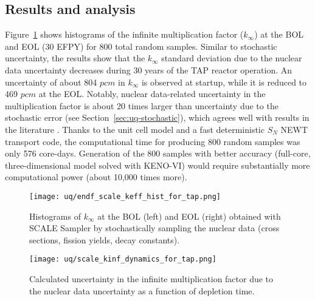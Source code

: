 \subsection{Results and analysis}
Figure~\ref{fig:uq-scale-kinf-hist} shows histograms of the 
infinite multiplication factor ($k_{\infty}$) at the \gls{BOL} and \gls{EOL} 
(30 \gls{EFPY}) for 800 total random samples. Similar to stochastic 
uncertainty, the results show that the $k_{\infty}$ standard deviation due to 
the nuclear data uncertainty decreases during 30 years of the \gls{TAP} 
reactor operation. An uncertainty of about 804 $pcm$ in $k_{\infty}$ is 
observed at startup, while it is reduced to 469 $pcm$ at the \gls{EOL}. 
Notably, nuclear data-related uncertainty in the multiplication factor is 
about 20 times larger than uncertainty due to the stochastic error (see 
Section~\ref{sec:uq-stochastic}), which agrees well with results in the 
literature \cite{takeda_estimation_1999, garcia-herranz_propagation_2008}. 
Thanks to the unit cell model and a fast deterministic $S_N$ NEWT transport 
code, the computational time for producing 800 random samples was only 576 
core-days. Generation of the 800 samples with better accuracy (full-core, 
three-dimensional model solved with KENO-VI) would require substantially more 
computational power (about 10,000 times more).
\begin{figure}[htp!] %
	\centering
	\texttt{[image: uq/endf\_scale\_keff\_hist\_for\_tap.png]}
	\vspace{-8mm}
	\caption{Histograms of $k_{\infty}$ at the \gls{BOL} (left) and 
		\gls{EOL} (right) obtained with SCALE Sampler by stochastically 
		sampling the nuclear data (cross sections, fission yields, decay 
		constants).}
	\label{fig:uq-scale-kinf-hist}
\end{figure}
\begin{figure}[hbp!] %
	\centering
	\texttt{[image: uq/scale\_kinf\_dynamics\_for\_tap.png]}
	\caption{Calculated uncertainty in the infinite multiplication factor due 
		to the nuclear data uncertainty as a function of depletion time.}
	\label{fig:uq-scale-kinf}
\end{figure}

